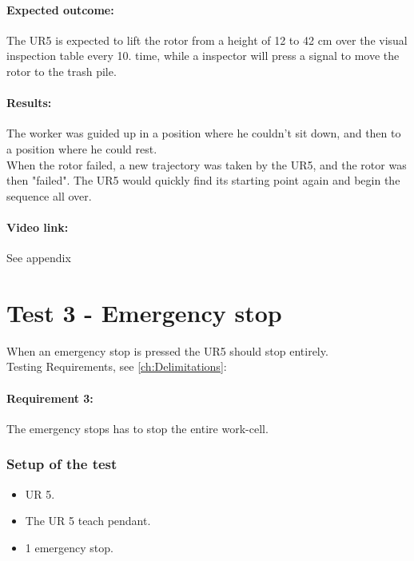 \paragraph{Expected outcome:} 
The UR5 is expected to lift the rotor from a height of 12 to 42 cm over the visual inspection table every 10. time, while a inspector will press a signal to move the rotor to the trash pile. 

\paragraph{Results: }

The worker was guided up in a position where he couldn't sit down, and then to a position where he could rest.\\
When the rotor failed, a new trajectory was taken by the UR5, and the rotor was then "failed". The UR5 would quickly find its starting point again and begin the sequence all over.\\

\paragraph{Video link: }
See appendix \cite{testfilm}

\section{Test 3 - Emergency stop}

When an emergency stop is pressed the UR5 should stop entirely.\\
Testing Requirements, see  \ref{ch:Delimitations}:\\

\paragraph{Requirement 3:} The emergency stops has to stop the entire work-cell.\\

\subsubsection{Setup of the test}

\begin{itemize}
    \item UR 5.
    \item The UR 5 teach pendant.
    \item 1 emergency stop.
\end{itemize}

